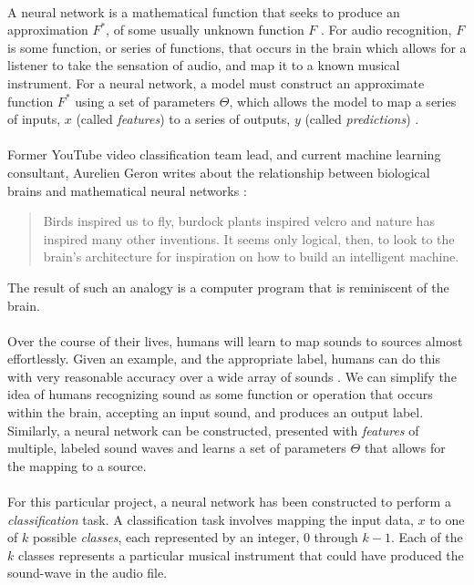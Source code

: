 \documentclass[12pt,letterpaper]{article}
\begin{document}
\paragraph*{}A neural network is a mathematical function that seeks to produce an approximation $F^*$, of some usually unknown function $F$ . For audio recognition, $F$ is some function, or series of functions, that occurs in the brain which allows for a listener to take the sensation of audio, and map it to a known musical instrument. For a neural network, a model must construct an approximate function $F^*$ using a set of parameters $\Theta$, which allows the model to map a series of inputs, $x$ (called \textit{features}) to a series of outputs, $y$ (called \textit{predictions}) \cite{Goodfellow,James,Virtanen}.

\paragraph*{}Former YouTube video classification team lead, and current machine learning consultant, Aurelien Geron writes about the relationship between biological brains and mathematical neural networks \cite{Geron}: 
\begin{quote}
Birds inspired us to fly, burdock plants inspired velcro and nature has inspired many other inventions. It seems only logical, then, to look to the brain's architecture for inspiration on how to build an intelligent machine.
\end{quote}
The result of such an analogy is a computer program that is reminiscent of the brain. 

\paragraph*{}Over the course of their lives, humans will learn to map sounds to sources almost effortlessly. Given an example, and the appropriate label, humans can do this with very reasonable accuracy over a wide array of sounds \cite{Olsen,White}. We can simplify the idea of humans recognizing sound as some function or operation that occurs within the brain, accepting an input sound, and produces an output label. Similarly, a neural network can be constructed, presented with \textit{features} of multiple, labeled sound waves and learns a set of parameters $\Theta$ that allows for the mapping to a source.

\paragraph*{}For this particular project, a neural network has been constructed to perform a \textit{classification} task. A classification task involves mapping the input data, $x$ to one of $k$ possible \textit{classes}, each represented by an integer, $0$ through $k-1$. Each of the $k$ classes represents a particular musical instrument that could have produced the sound-wave in the audio file. 
\end{document}
